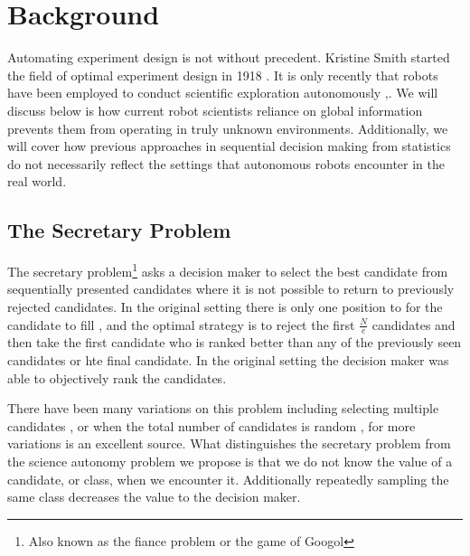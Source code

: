 \section{Background}
\label{sec:background}

Automating experiment design is not without precedent.  Kristine Smith started the field of optimal experiment design in 1918 \cite{smith1918standard}.
It is only recently that robots have been employed to conduct scientific exploration autonomously \cite{wagner2001science},\cite{king2004functional}.  We will discuss below is how current robot scientists reliance on global information prevents them from operating in truly unknown environments.  Additionally, we will cover how previous approaches in sequential decision making from statistics do not necessarily reflect the settings that autonomous robots encounter in the real world.


\subsection{The Secretary Problem}

The secretary problem\footnote{Also known as the fiance problem or the game of
Googol} asks a decision maker to select the best candidate from sequentially
presented candidates where it is not possible to return to previously rejected
candidates.  In the original setting there is only one position to for the
candidate to fill \cite{ferguson1989solved}, and the optimal strategy is to
reject the first $\frac{N}{e}$ candidates and then take the first candidate who
is ranked better than any of the previously seen candidates or hte final
candidate.  In the original setting the decision maker was able to objectively
rank the candidates.   

There have been many variations on this problem including selecting multiple
candidates \cite{vanderbei1980optimal}, or when the total number of candidates
is random \cite{presman1972best}, for more variations \cite{ferguson1989solved}
is an excellent source.  What distinguishes the secretary problem from the
science autonomy problem we propose is that we do not know the value of a
candidate, or class, when we encounter it.  Additionally repeatedly sampling
the same class decreases the value to the decision maker. 


% 


